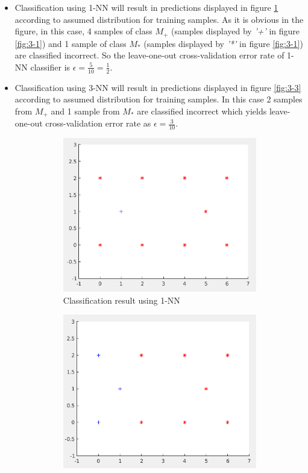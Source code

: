 \documentclass[12pt]{article}
\begin{document}
\begin{itemize}
\item Classification using 1-NN will result in predictions displayed in figure \ref{fig:3-2} according to assumed distribution for training samples. As it is obvious in the figure, in this case, 4 samples of class $M_+$ (samples displayed by \textit{'+'} in figure \ref{fig:3-1}) and 1 sample of class $M_*$ (samples displayed by \textit{'*'} in figure \ref{fig:3-1}) are classified incorrect. So the leave-one-out cross-validation error rate of 1-NN classifier is $\epsilon = \frac{5}{10} = \frac{1}{2}$.
\item Classification using 3-NN will result in predictions displayed in figure \ref{fig:3-3} according to assumed distribution for training samples. In this case 2 samples from $M_+$ and 1 sample from $M_*$ are classified incorrect which yields leave-one-out cross-validation error rate as $\epsilon = \frac{3}{10}$.
\begin{figure}[h]
\centering
\begin{subfigure}{0.45\textwidth}
\includegraphics[scale=0.35]{Imgs/3-2.png}
\caption{Classification result using 1-NN}
\label{fig:3-2}
\end{subfigure}
\begin{subfigure}{0.45\textwidth}
\includegraphics[scale=0.35]{Imgs/3-3.png}

\end{subfigure}
\end{figure}
\end{itemize}
\end{document}
